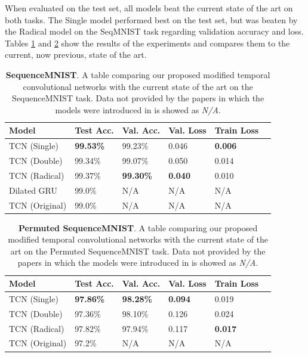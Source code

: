 \documentclass[a4paper, twoside]{article}
\begin{document}
When evaluated on the test set, all models beat the current state of the art on both tasks. The Single model performed best on the test set, but was beaten by the Radical model on the SeqMNIST task regarding validation accuracy and loss. Tables \ref{tabseqmnist} and \ref{tabpmnist} show the results of the experiments and compares them to the current, now previous, state of the art.

\begin{table}
\begin{center}
    \begin{tabular}{| l | l | l | l | l | l |}
    \hline
    Model & Test Acc. & Val. Acc. & Val. Loss & Train Loss\\ \hline \hline
    TCN (Single) & \textbf{99.53\%} & 99.23\% & 0.046 & \textbf{0.006} \\ \hline
    TCN (Double) & 99.34\% & 99.07\% & 0.050 & 0.014 \\ \hline
    TCN (Radical) & 99.37\% & \textbf{99.30\%} & \textbf{0.040} & 0.010 \\ \hline
    Dilated GRU \cite{dilatedgru} & 99.0\% & N/A & N/A & N/A \\ \hline
    TCN (Original) \cite{tcn} & 99.0\% & N/A & N/A & N/A \\ \hline
    \end{tabular}
    \caption{\textbf{SequenceMNIST}. A table comparing our proposed modified temporal convolutional networks with the current state of the art on the SequenceMNIST task. Data not provided by the papers in which the models were introduced in is showed as \textit{N/A}.} \label{tabseqmnist}
\end{center}
\end{table}

\begin{table}
\begin{center}
    \begin{tabular}{| l | l | l | l | l | l |}
    \hline
    Model & Test Acc. & Val. Acc. & Val. Loss & Train Loss\\ \hline \hline
    TCN (Single) & \textbf{97.86\%} & \textbf{98.28\%} & \textbf{0.094}  & 0.019 \\ \hline
    TCN (Double) & 97.36\% & 98.10\% & 0.126  & 0.024 \\ \hline
    TCN (Radical) & 97.82\% & 97.94\% & 0.117  & \textbf{0.017} \\ \hline
    TCN (Original) \cite{tcn} & 97.2\% & N/A & N/A & N/A \\ \hline
    \end{tabular}
    \caption{\textbf{Permuted SequenceMNIST}. A table comparing our proposed modified temporal convolutional networks with the current state of the art on the Permuted SequenceMNIST task. Data not provided by the papers in which the models were introduced in is showed as \textit{N/A}.} \label{tabpmnist}
\end{center}
\end{table}
\end{document}
